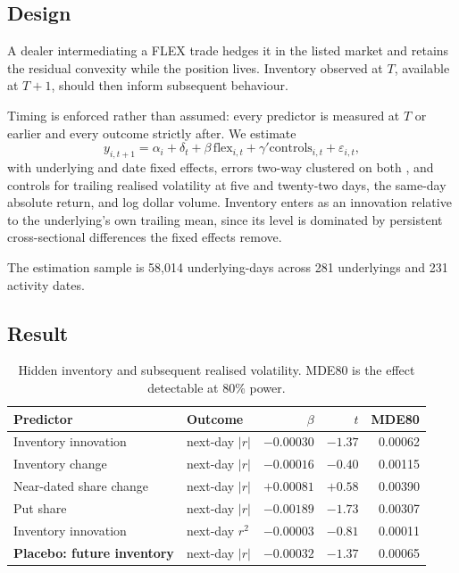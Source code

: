 \documentclass[11pt]{article}
\begin{document}
\subsection{Design}

A dealer intermediating a FLEX trade hedges it in the listed market and retains the
residual convexity while the position lives. Inventory observed at $T$, available at
$T+1$, should then inform subsequent behaviour.

Timing is enforced rather than assumed: every predictor is measured at $T$ or earlier
and every outcome strictly after. We estimate
\begin{equation}
y_{i,t+1}
= \alpha_i + \delta_t
+ \beta\,\text{flex}_{i,t}
+ \gamma' \text{controls}_{i,t}
+ \varepsilon_{i,t},
\label{eq:pred}
\end{equation}
with underlying and date fixed effects, errors two-way clustered on both
\citep{cameron2011}, and controls for trailing realised volatility at five and
twenty-two days, the same-day absolute return, and log dollar volume. Inventory enters
as an innovation relative to the underlying's own trailing mean, since its level is
dominated by persistent cross-sectional differences the fixed effects remove.

The estimation sample is 58,014 underlying-days across 281 underlyings and 231 activity
dates.

\subsection{Result}

\begin{table}[t]
\centering
\caption{Hidden inventory and subsequent realised volatility. MDE80 is the effect
detectable at 80\% power.}
\label{tab:pred}
\begin{tabular}{llrrr}
\toprule
Predictor & Outcome & $\beta$ & $t$ & MDE80 \\
\midrule
Inventory innovation & next-day $|r|$ & $-0.00030$ & $-1.37$ & 0.00062 \\
Inventory change & next-day $|r|$ & $-0.00016$ & $-0.40$ & 0.00115 \\
Near-dated share change & next-day $|r|$ & $+0.00081$ & $+0.58$ & 0.00390 \\
Put share & next-day $|r|$ & $-0.00189$ & $-1.73$ & 0.00307 \\
Inventory innovation & next-day $r^2$ & $-0.00003$ & $-0.81$ & 0.00011 \\
\midrule
\textbf{Placebo: future inventory} & next-day $|r|$ & $\mathbf{-0.00032}$ & $\mathbf{-1.37}$ & 0.00065 \\
\bottomrule
\end{tabular}
\end{table}
\end{document}
